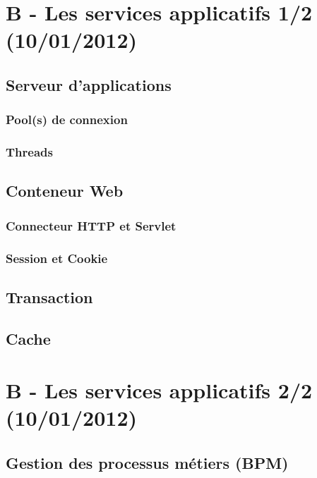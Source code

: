 \section{B - Les services applicatifs 1/2 (10/01/2012)}


\subsection{Serveur d'applications}
\subsubsection{Pool(s) de connexion}
\subsubsection{Threads}

\subsection{Conteneur Web}
\subsubsection{Connecteur HTTP et Servlet}
\subsubsection{Session et Cookie}

\subsection{Transaction}

\subsection{Cache}

\section{B - Les services applicatifs 2/2 (10/01/2012)}
\subsection{Gestion des processus métiers (BPM)}

